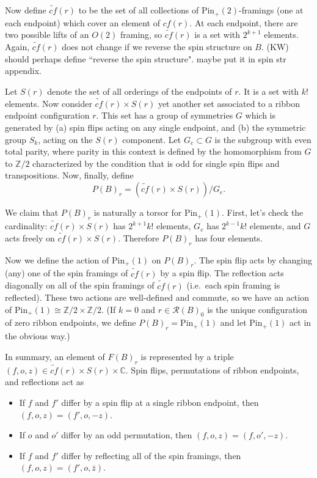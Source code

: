 \documentclass[12pt,a4paper]{article}
\newcommand{\zz}{\mathbb{Z}}
\newcommand{\cc}{\mathbb{C}}
\newcommand{\mcr}{\mathcal{R}}
\newcommand\be            {\begin{equation}}
\newcommand\ee            {\end{equation}}
\newcommand{\pin}{\text{Pin}}
\newcommand{\kw}[1]{{\color{kwcolor}\footnotesize{(KW) #1}}}
\begin{document}
\newcommand{\tcf}{\widetilde{cf}}

Now define $\tcf(r)$ to be the set of all collections of $\pin_+(2)$-framings (one at each endpoint)
which cover an element of $cf(r)$.
At each endpoint, there are two possible lifts of an $O(2)$ framing, 
so $\tcf(r)$ is a set with $2^{k+1}$ elements.
Again, $\tcf(r)$ does not change if we reverse the spin structure on $B$.
\kw{should perhaps define ``reverse the spin structure".  maybe put it in spin str appendix.}

Let $S(r)$ denote the set of all orderings of the endpoints of $r$.
It is a set with $k!$ elements.
Now consider $\tcf(r) \times S(r)$ yet another set associated to a ribbon endpoint configuration $r$.
This set has a group of symmetries $G$ which is generated by (a) spin flips acting on any single endpoint, 
and (b) the symmetric group $S_k$, acting on the $S(r)$ component.
Let $G_e \subset G$ is the subgroup with even total parity, where 
parity in this context is defined by the homomorphism from $G$ to $\zz/2$
characterized by the condition that is odd for single spin flips and transpositions.
Now, finally, define
\be
	P(B)_r = (\tcf(r) \times S(r))/G_e .
\ee

We claim that $P(B)_r$ is naturally a torsor for $\pin_+(1)$.
First, let's check the cardinality:
$\tcf(r) \times S(r)$ has $2^{k+1} k!$ elements,
$G_e$ has $2^{k-1} k!$ elements, and $G$ acts freely on $\tcf(r) \times S(r)$.
Therefore $P(B)_r$ has four elements.

Now we define the action of $\pin_+(1)$ on $P(B)_r$.
The spin flip acts by changing (any) one of the spin framings of $\tcf(r)$ by a spin flip.
The reflection acts diagonally on all of the spin framings of $\tcf(r)$
(i.e.\ each spin framing is reflected).
These two actions are well-defined and commute, so we have
an action of $\pin_+(1) \cong \zz/2\times\zz/2$.
(If $k = 0$ and $r \in \mcr(B)_0$ is the unique configuration of zero ribbon endpoints,
we define $P(B)_r = \pin_+(1)$ and let $\pin_+(1)$ act in the obvious way.)

\medskip

In summary, an element of $F(B)_r$ is represented by a triple $(f, o, z) \in \tcf(r) \times S(r) \times \cc$.
Spin flips, permutations of ribbon endpoints, and reflections act as
\begin{itemize}
\item If $f$ and $f'$ differ by a spin flip at a single ribbon endpoint, then $(f, o, z) = (f', o, -z)$.
\item If $o$ and $o'$ differ by an odd permutation, then $(f, o, z) = (f, o', -z)$.
\item If $f$ and $f'$ differ by reflecting all of the spin framings, then $(f, o, z) = (f', o, \bar z)$.
\end{itemize}
\end{document}
